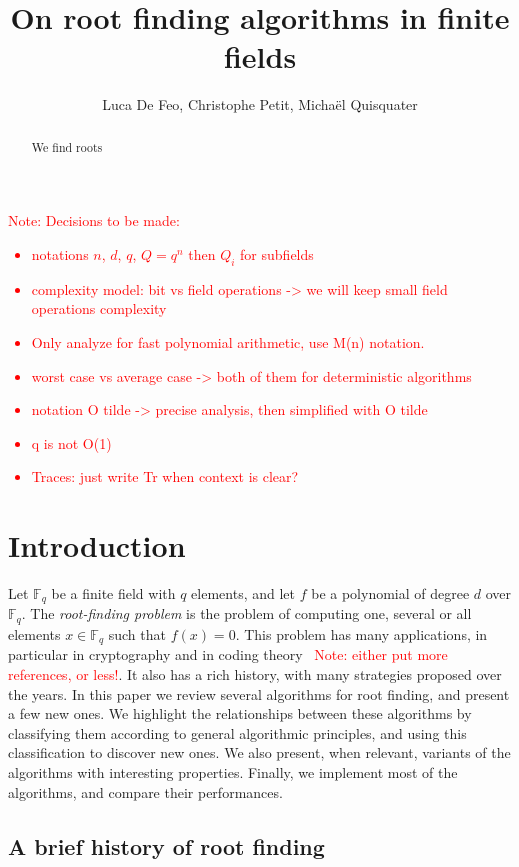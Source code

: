 \documentclass{article}
\author{Luca De Feo, Christophe Petit, Micha\"el Quisquater}
\title{On root finding algorithms in finite fields}
\newcommand{\ff}[1]{\mathbb{F}_{#1}}
\newcounter{algo}
\newcommand{\Notes}[1]{\textcolor{red}{Note: #1}}
\begin{document}
\maketitle
\begin{abstract}
  We find roots
\end{abstract}


\Notes{
Decisions to be made:
\begin{itemize}
\item notations $n$, $d$, $q$, $Q=q^n$ then $Q_i$ for subfields
\item complexity model: bit vs field operations -> we will keep small field operations complexity
\item Only analyze for fast polynomial arithmetic, use M(n) notation.
\item worst case vs average case -> both of them for deterministic algorithms
\item notation O tilde -> precise analysis, then simplified with O tilde
\item q is not O(1)
\item Traces: just write Tr when context is clear?
\end{itemize}
}




\section{Introduction}
\label{sec:introduction}

Let $\ff{q}$ be a finite field with $q$ elements, and let $f$ be a
polynomial of degree $d$ over $\ff{q}$.
%
The \emph{root-finding problem} is the problem of computing one,
several or all elements $x∈\ff{q}$ such that $f(x)=0$.
%
This problem has many applications, in particular in cryptography and
in coding theory~\cite{McEliece78} \Notes{either put more references,
  or less!}. It also has a rich history, with many strategies proposed
over the years. In this paper we review several algorithms for root
finding, and present a few new ones.  We highlight the relationships
between these algorithms by classifying them according to general
algorithmic principles, and using this classification to discover new
ones. We also present, when relevant, variants of the algorithms with
interesting properties. Finally, we implement most of the algorithms,
and compare their performances.

\subsection{A brief history of root finding}
\label{sec:brief-history-root}
\end{document}
